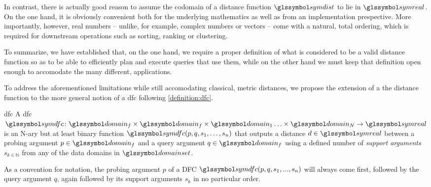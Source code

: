 In contrast, there is actually good reason to assume the codomain of a distance function  $\symdist$ to lie in $\symreal$. On the one hand, it is obviously convenient both for the underlying mathematics as well as from an implementation prespective. More importantly, however, real numbers -- unlike, for example, complex numbers or vectors -- come with a natural, total ordering, which is required for downstream operations such as sorting, ranking or clustering.

To summarize, we have established that, on the one hand, we require a proper definition of what is considered to be a valid distance function so as to be able to efficiently plan and execute queries that use them, while on the other hand we must keep that definition open enough to accomodate the many different, applications.

To address the aforementioned limitations while still accomodating classical, metric distances, we propose the extension of a the distance function to the more general notion of a \acrfull{dfc} following \cref{definition:dfc}.

\begin{definition}[label=definition:dfc]{\acrlong{dfc}}{}
    A \acrshort{dfc} $\symdfc \colon \domain_f \times \domain_f \times \domain_{1} \ldots \times \domain_{N} \to \symreal$ is an N-ary but at least binary function $\symdfc(p,q,s_1,\ldots,s_n)$ that outputs a distance $d \in \symreal$ between a probing argument $p \in \domain_f$ and a query argument $q \in \domain_f$ using a defined number of \emph{support arguments} $s_{k \in \mathbb{N}}$ from any of the data domains in $\domainset$.

    As a convention for notation, the probing argument $p$ of a DFC $\symdfc(p,q,s_1,...,s_n)$ will always come first, followed by the query argument $q$, again followed by its support arguments $s_k$ in no particular order.
\end{definition}

